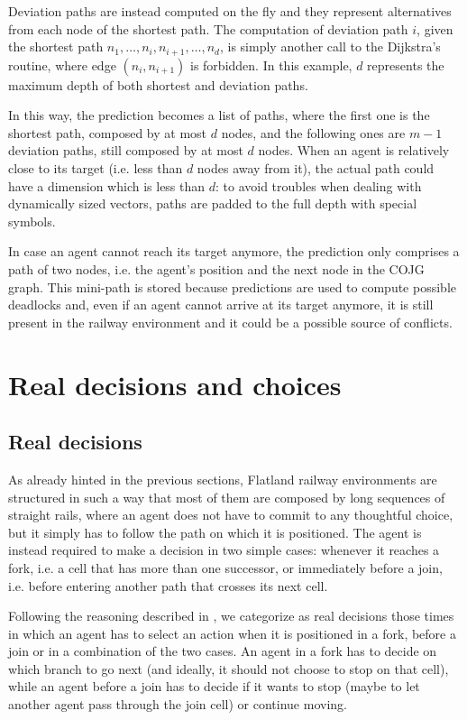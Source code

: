 \documentclass[a4paper,10pt]{report}
\begin{document}
Deviation paths are instead computed on the fly and they represent alternatives from each node of the shortest path. The computation of deviation path $i$, given the shortest path $n_1, \dots, n_i, n_{i+1}, \dots, n_d$, is simply another call to the Dijkstra's routine, where edge $(n_i, n_{i+1})$ is forbidden. In this example, $d$ represents the maximum depth of both shortest and deviation paths.

In this way, the prediction becomes a list of paths, where the first one is the shortest path, composed by at most $d$ nodes, and the following ones are $m-1$ deviation paths, still composed by at most $d$ nodes. When an agent is relatively close to its target (i.e. less than $d$ nodes away from it), the actual path could have a dimension which is less than $d$: to avoid troubles when dealing with dynamically sized vectors, paths are padded to the full depth with special symbols.

In case an agent cannot reach its target anymore, the prediction only comprises a path of two nodes, i.e. the agent's position and the next node in the COJG graph. This mini-path is stored because predictions are used to compute possible deadlocks and, even if an agent cannot arrive at its target anymore, it is still present in the railway environment and it could be a possible source of conflicts.

\section{Real decisions and choices}\label{sec:real-decisions-choices}

\subsection{Real decisions}\label{subsec:real-decisions}
As already hinted in the previous sections, Flatland railway environments are structured in such a way that most of them are composed by long sequences of straight rails, where an agent does not have to commit to any thoughtful choice, but it simply has to follow the path on which it is positioned. The agent is instead required to make a decision in two simple cases: whenever it reaches a fork, i.e. a cell that has more than one successor, or immediately before a join, i.e. before entering another path that crosses its next cell.

Following the reasoning described in \cite{jonas}, we categorize as real decisions those times in which an agent has to select an action when it is positioned in a fork, before a join or in a combination of the two cases. An agent in a fork has to decide on which branch to go next (and ideally, it should not choose to stop on that cell), while an agent before a join has to decide if it wants to stop (maybe to let another agent pass through the join cell) or continue moving.
\end{document}
